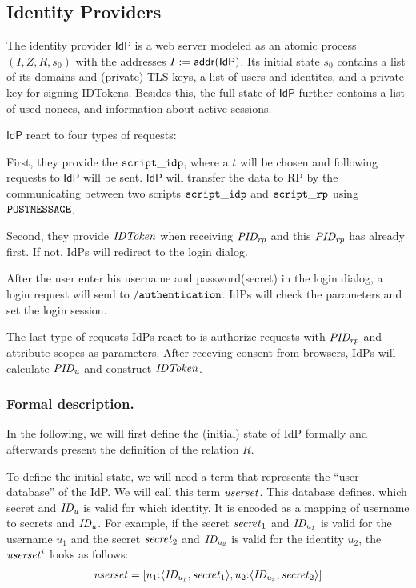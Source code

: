 \documentclass[letterpaper,onecolumn,10pt]{article}
\begin{document}
\subsection{Identity Providers} \label{app:idps}

The identity provider $\mathsf{IdP}$ is a web server 
modeled as an atomic process $(I, Z, R, s_0)$ with 
the addresses $I := \mathsf{addr}(\mathsf{IdP})$. 
Its initial state $s_0$ contains a list of its 
domains and (private) TLS keys, 
a list of users and identites, and a private key 
for signing IDTokens. Besides this, 
the full state of $\mathsf{IdP}$ further contains a list 
of used nonces, and information about active sessions.

$\mathsf{IdP}$ react to four types of requests:

First, they provide the $\mathtt{script\_idp}$, where a $t$ 
will be chosen and following requests to $\mathsf{IdP}$ 
will be sent. $\mathsf{IdP}$ will transfer the data
to RP by the communicating between two scripts $\mathtt{script\_idp}$ 
and $\mathtt{script\_rp}$ using $\mathtt{POSTMESSAGE}$.

Second, they provide $\mathit{IDToken}$ when receiving $\mathit{PID_{rp}}$ and this 
$\mathit{PID_{rp}}$ has already first. If not, IdPs will redirect to the login dialog.

After the user enter his username and password(secret) in the login dialog, a login
request will send to $\mathtt{/authentication}$. IdPs will check the parameters and 
set the login session.

The last type of requests IdPs react to is authorize requests with $\mathit{PID_{rp}}$ and attribute
scopes as parameters. After receving consent from browsers, IdPs will calculate 
$\mathit{PID_{u}}$ and construct $\mathit{IDToken}$.

\subsubsection{Formal description.} In the following, we 
will first define the (initial) state of IdP formally and 
afterwards present the definition of the relation $R$.

To define the initial state, we will need a term that 
represents the ``user database'' of the IdP. We will 
call this term $\mathit{userset}$. This database defines, 
which secret and $\mathit{ID_u}$ is valid for which identity. 
It is encoded as a mapping of username to secrets and $\mathit{ID_u}$. 
For example, if the secret $\mathit{secret}_1$ and $\mathit{ID_{u_1}}$ is 
valid for the username $u_1$ and the secret $\mathit{secret}_2$ 
and $\mathit{ID_{u_2}}$ is valid for the identity $u_2$, the 
$\mathit{userset}^i$ looks as follows:
\begin{align*}
\mathit{userset} = [u_1{:}\langle {{}\mathit{ID_{u_1}}, \mathit{secret}_1} \rangle, 
  u_2{:}\langle {{}\mathit{ID_{u_2}}, \mathit{secret}_2} \rangle]
\end{align*}
\end{document}
